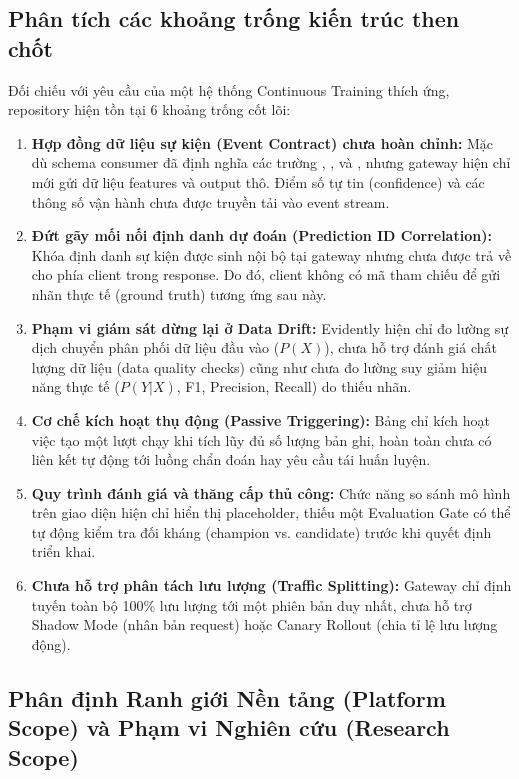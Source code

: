 \subsection{Phân tích các khoảng trống kiến trúc then chốt}
Đối chiếu với yêu cầu của một hệ thống Continuous Training thích ứng, repository hiện tồn tại 6 khoảng trống cốt lõi:
\begin{enumerate}
  \item \textbf{Hợp đồng dữ liệu sự kiện (Event Contract) chưa hoàn chỉnh:} Mặc dù schema consumer đã định nghĩa các trường , ,  và , nhưng gateway  hiện chỉ mới gửi dữ liệu features và output thô. Điểm số tự tin (confidence) và các thông số vận hành chưa được truyền tải vào event stream.
  \item \textbf{Đứt gãy mối nối định danh dự đoán (Prediction ID Correlation):} Khóa định danh sự kiện  được sinh nội bộ tại gateway nhưng chưa được trả về cho phía client trong response. Do đó, client không có mã tham chiếu để gửi nhãn thực tế (ground truth) tương ứng sau này.
  \item \textbf{Phạm vi giám sát dừng lại ở Data Drift:} Evidently hiện chỉ đo lường sự dịch chuyển phân phối dữ liệu đầu vào ($P(X)$), chưa hỗ trợ đánh giá chất lượng dữ liệu (data quality checks) cũng như chưa đo lường suy giảm hiệu năng thực tế ($P(Y|X)$, F1, Precision, Recall) do thiếu nhãn.
  \item \textbf{Cơ chế kích hoạt thụ động (Passive Triggering):} Bảng  chỉ kích hoạt việc tạo một lượt chạy  khi tích lũy đủ số lượng bản ghi, hoàn toàn chưa có liên kết tự động tới luồng chẩn đoán hay yêu cầu tái huấn luyện.
  \item \textbf{Quy trình đánh giá và thăng cấp thủ công:} Chức năng so sánh mô hình trên giao diện hiện chỉ hiển thị placeholder, thiếu một Evaluation Gate có thể tự động kiểm tra đối kháng (champion vs. candidate) trước khi quyết định triển khai.
  \item \textbf{Chưa hỗ trợ phân tách lưu lượng (Traffic Splitting):} Gateway chỉ định tuyến toàn bộ 100\% lưu lượng tới một phiên bản duy nhất, chưa hỗ trợ Shadow Mode (nhân bản request) hoặc Canary Rollout (chia tỉ lệ lưu lượng động).
\end{enumerate}

\subsection{Phân định Ranh giới Nền tảng (Platform Scope) và Phạm vi Nghiên cứu (Research Scope)}

